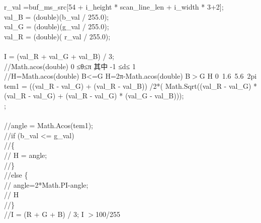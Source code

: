 ﻿\documentclass[12pt,a4paper,oneside]{book}
\begin{document}
\begin{enumerate}
\hspace*{8em}r\_val  =buf\_ms\_src[54 + i\_height * scan\_line\_len + i\_width * 3+2];\\
\hspace*{8em}val\_B = (double)(b\_val / 255.0);\\
\hspace*{8em}val\_G = (double)(g\_val / 255.0);\\
\hspace*{8em}val\_R = (double)( r\_val / 255.0);\\
\hspace*{8em}\\
\hspace*{8em}I = (val\_R + val\_G + val\_B) / 3;\\
\hspace*{8em}//Math.acos(double)   0 ≤θ≤π 其中 -1 ≤d≤ 1\\
\hspace*{8em}//H=Math.acos(double) B<=G H=2π-Math.acos(double) B$>$G H  0~1.6~5.6~2pi  \\
\hspace*{8em}tem1 = ((val\_R - val\_G) + (val\_R - val\_B)) /2*( Math.Sqrt((val\_R - val\_G) * (val\_R - val\_G) + (val\_R - val\_G) * (val\_G - val\_B)));\\
\hspace*{8em};\\
\hspace*{8em}\\
\hspace*{8em}//angle = Math.Acos(tem1);\\
\hspace*{8em}//if (b\_val <= g\_val)\\
\hspace*{8em}//\{\\
\hspace*{8em}//    H = angle;\\
\hspace*{8em}//\}\\
\hspace*{8em}//else \{ \\
\hspace*{8em}//    angle=2*Math.PI-angle;\\
\hspace*{8em}//    H\\
\hspace*{8em}//\}\\
\hspace*{8em}//I = (R + G + B) / 3;  I $>$100/255\\

\end{enumerate}
\end{document}
